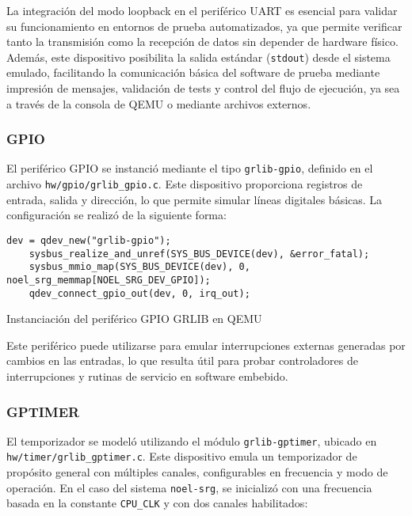 La integración del modo loopback en el periférico UART es esencial para validar su funcionamiento en entornos de prueba automatizados, ya que permite verificar tanto la transmisión como la recepción de datos sin depender de hardware físico. Además, este dispositivo posibilita la salida estándar (\texttt{stdout}) desde el sistema emulado, facilitando la comunicación básica del software de prueba mediante impresión de mensajes, validación de tests y control del flujo de ejecución, ya sea a través de la consola de QEMU o mediante archivos externos.

\subsubsection*{GPIO}

El periférico GPIO se instanció mediante el tipo \texttt{grlib-gpio}, definido en el archivo \texttt{hw/gpio/grlib\_gpio.c}. Este dispositivo proporciona registros de entrada, salida y dirección, lo que permite simular líneas digitales básicas. La configuración se realizó de la siguiente forma:

\begin{codefloat}
\begin{lstlisting}[style=CppExample]
    dev = qdev_new("grlib-gpio");
    sysbus_realize_and_unref(SYS_BUS_DEVICE(dev), &error_fatal);
    sysbus_mmio_map(SYS_BUS_DEVICE(dev), 0, noel_srg_memmap[NOEL_SRG_DEV_GPIO]);
    qdev_connect_gpio_out(dev, 0, irq_out);
\end{lstlisting}
\caption{Instanciación del periférico GPIO GRLIB en QEMU}
\end{codefloat}


Este periférico puede utilizarse para emular interrupciones externas generadas por cambios en las entradas, lo que resulta útil para probar controladores de interrupciones y rutinas de servicio en software embebido.

\subsubsection*{GPTIMER}

El temporizador se modeló utilizando el módulo \texttt{grlib-gptimer}, ubicado en \texttt{hw/timer/grlib\_gptimer.c}. Este dispositivo emula un temporizador de propósito general con múltiples canales, configurables en frecuencia y modo de operación. En el caso del sistema \texttt{noel-srg}, se inicializó con una frecuencia basada en la constante \texttt{CPU\_CLK} y con dos canales habilitados:


